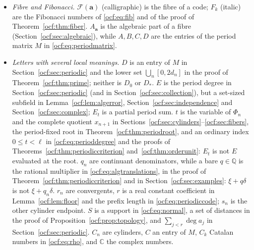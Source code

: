 \documentclass[11pt,a4paper]{article}
\numberwithin{equation}{section}
\theoremstyle{definition}
\theoremstyle{remark}
\newcommand{\R}{\mathbb R}
\newcommand{\Q}{\mathbb Q}
\newcommand{\C}{\mathbb C}
\newcommand{\F}{\mathcal F}
\newcommand{\dgr}{\operatorname{deg}}
\newcommand{\codea}{\boldsymbol a}
\newcommand{\rpath}[1]{\nolinkurl{#1}}%
\newcommand{\lbl}[1]{\nolinkurl{#1}}%
\begin{document}
\begin{itemize}[leftmargin=*,itemsep=3pt]
divisible nor convex; it is the field $\mathcal K_\R(G)$ of
\rpath{surreal/independent-surreal-copies}. A ``set-sized Hahn workspace'' is
such a $K_G$ containing the data; the workspaces of the foundations report
(\lbl{found:thm:workspace}) are of this kind with $G$ divisible, and no
divisibility is needed here. $K_{\codea}=\Q(a_0,a_1,\ldots)$ is the
countable field generated by the digits, and $K=K_{\codea}$ in
Section~\ref{ocf:sec:periodic}. The tempting reading of $K_{\codea}$ as a
Hahn field $K_G$ is false; $K_\R$ in Section~\ref{ocf:sec:examples} is $K_G$
at $G=\R$.
\item \emph{Fibre and Fibonacci.} $\F(\codea)$ (calligraphic) is the fibre
of a code; $F_k$ (italic) are the Fibonacci numbers of \eqref{ocf:eq:fib}
and of the proof of Theorem~\ref{ocf:thm:fiber}. $A_{\codea}$ is the
algebraic part of a fibre (Section~\ref{ocf:sec:algebraic}), while $A,B,C,D$
are the entries of the period matrix $M$ in \eqref{ocf:eq:periodmatrix}.
\item \emph{Letters with several local meanings.}
$D$ is an entry of $M$ in Section~\ref{ocf:sec:periodic} and the lower set
$\bigcup_n[0,2d_n]$ in the proof of Theorem~\ref{ocf:thm:prime}; neither is
$D_0$ or $D_*$.
$E$ is the period degree in Section~\ref{ocf:sec:periodic} (and in
Section~\ref{ocf:sec:collection}), but a set-sized subfield in
Lemma~\ref{ocf:lem:algerror}, Section~\ref{ocf:sec:independence} and
Section~\ref{ocf:sec:complex}; $E_t$ is a partial period sum.
$t$ is the variable of $\Phi_n$ and the complete quotient $x_{n+1}$ in
Sections~\ref{ocf:sec:cylinders}--\ref{ocf:sec:fibers}, the period-fixed
root in Theorem~\ref{ocf:thm:periodroot}, and an ordinary index
$0\le t<\ell$ in \eqref{ocf:eq:perioddegree} and the proofs of
Theorems~\ref{ocf:thm:periodiccriterion} and~\ref{ocf:thm:orderunit}:
$E_t$ is not $E$ evaluated at the root.
$q_n$ are continuant denominators, while a bare $q\in\Q$ is the rational
multiplier in \eqref{ocf:eq:algtranslations}, in the proof of
Theorem~\ref{ocf:thm:periodiccriterion} and in Section~\ref{ocf:sec:examples}:
$\xi+q\delta$ is not $\xi+q_n\delta$.
$r_n$ are convergents, $r$ is a real constant coefficient in
Lemma~\ref{ocf:lem:floor} and the prefix length in
\eqref{ocf:eq:periodiccode}; $s_n$ is the other cylinder endpoint.
$S$ is a support in \eqref{ocf:eq:normal}, a set of distances in the proof
of Proposition~\ref{ocf:prop:topology}, and $\sum_{j<r}\dgr a_j$ in
Section~\ref{ocf:sec:periodic}.
$C_n$ are cylinders, $C$ an entry of $M$, $C_k$ Catalan numbers in
\eqref{ocf:eq:rho}, and $\C$ the complex numbers.

\end{itemize}
\end{document}
